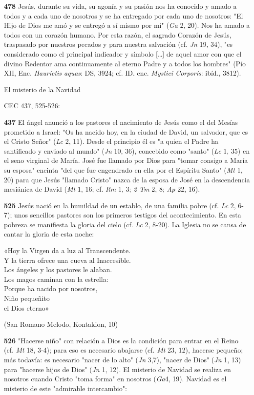 \documentclass[]{article}
\begin{document}
\textbf{478} Jesús, durante su vida, su agonía y su pasión nos ha
conocido y amado a todos y a cada uno de nosotros y se ha entregado por
cada uno de nosotros: "El Hijo de Dios me amó y se entregó a sí mismo
por mí" (\emph{Ga} 2, 20). Nos ha amado a todos con un corazón humano.
Por esta razón, el sagrado Corazón de Jesús, traspasado por nuestros
pecados y para nuestra salvación (cf. \emph{Jn} 19, 34), "es considerado
como el principal indicador y símbolo [\ldots{}] de aquel amor con que el
divino Redentor ama continuamente al eterno Padre y a todos los hombres"
(Pío XII, Enc. \emph{Haurietis aquas}: DS, 3924; cf. ID. enc.
\emph{Mystici Corporis}: ibíd., 3812).

El misterio de la Navidad

CEC 437, 525-526:

\textbf{437} El ángel anunció a los pastores el nacimiento de Jesús como
el del Mesías prometido a Israel: "Os ha nacido hoy, en la ciudad de
David, un salvador, que es el Cristo Señor" (\emph{Lc} 2, 11). Desde el
principio él es "a quien el Padre ha santificado y enviado al mundo"
(\emph{Jn} 10, 36), concebido como "santo" (\emph{Lc} 1, 35) en el seno
virginal de María. José fue llamado por Dios para "tomar consigo a María
su esposa" encinta "del que fue engendrado en ella por el Espíritu
Santo" (\emph{Mt} 1, 20) para que Jesús "llamado Cristo" nazca de la
esposa de José en la descendencia mesiánica de David (\emph{Mt} 1, 16;
cf. \emph{Rm} 1, 3; \emph{2 Tm} 2, 8; \emph{Ap} 22, 16).

\textbf{525} Jesús nació en la humildad de un establo, de una familia
pobre (cf. \emph{Lc} 2, 6-7); unos sencillos pastores son los primeros
testigos del acontecimiento. En esta pobreza se manifiesta la gloria del
cielo (cf. \emph{Lc} 2, 8-20). La Iglesia no se cansa de cantar la
gloria de esta noche:

«Hoy la Virgen da a luz al Transcendente.\\
Y la tierra ofrece una cueva al Inaccesible.\\
Los ángeles y los pastores le alaban.\\
Los magos caminan con la estrella:\\
Porque ha nacido por nosotros,\\
Niño pequeñito\\
el Dios eterno»

(San Romano Melodo, Kontakion, 10)

\textbf{526} "Hacerse niño" con relación a Dios es la condición para
entrar en el Reino (cf. \emph{Mt} 18, 3-4); para eso es necesario
abajarse (cf. \emph{Mt} 23, 12), hacerse pequeño; más todavía: es
necesario "nacer de lo alto" (\emph{Jn} 3,7), "nacer de Dios" (\emph{Jn}
1, 13) para "hacerse hijos de Dios" (\emph{Jn} 1, 12). El misterio de
Navidad se realiza en nosotros cuando Cristo "toma forma" en nosotros
(\emph{Ga}4, 19). Navidad es el misterio de este "admirable
intercambio":
\end{document}

